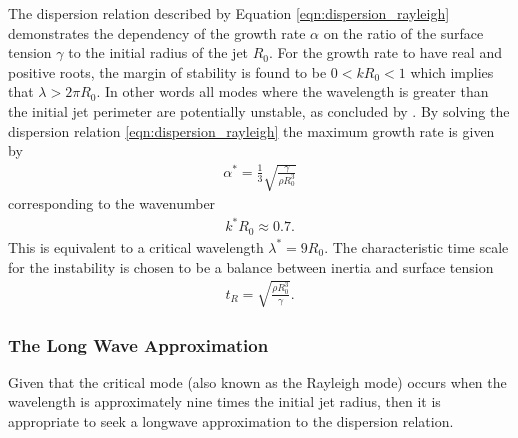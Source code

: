 \documentclass[11pt]{article}
\begin{document}
The dispersion relation described by Equation \ref{eqn:dispersion_rayleigh} 
demonstrates the dependency of the growth rate $\alpha$ on the ratio of the 
surface tension $\gamma$ to the initial radius of the jet $R_0$. For the growth 
rate to have real and positive roots, the margin of stability is found to be $0 
< kR_0 <1$ which implies that $\lambda > 2 \pi R_0$. In other words all modes 
where the wavelength is greater than the initial jet perimeter are potentially 
unstable, as concluded by \cite{plateau1873statique}. By solving the dispersion 
relation \ref{eqn:dispersion_rayleigh} the maximum growth rate is given by 
\begin{align*}
\alpha^* = \frac{1}{3} \sqrt{\frac{\gamma}{\rho R_0^3}}
\end{align*}
corresponding to the wavenumber
\begin{align*}
k^*R_0 \approx 0.7.
\end{align*}
This is equivalent to a critical wavelength $\lambda^* = 9 R_0$. The 
characteristic time scale for the instability is chosen to be a balance between 
inertia and surface tension
\begin{align*}
t_R = \sqrt{\frac{\rho R_0^3}{\gamma}}.
\end{align*}

\subsubsection{The Long Wave Approximation}
Given that the critical mode (also known as the Rayleigh mode) occurs when the 
wavelength is approximately nine times the initial jet radius, then it is 
appropriate to seek a longwave approximation to the dispersion relation.
\end{document}
